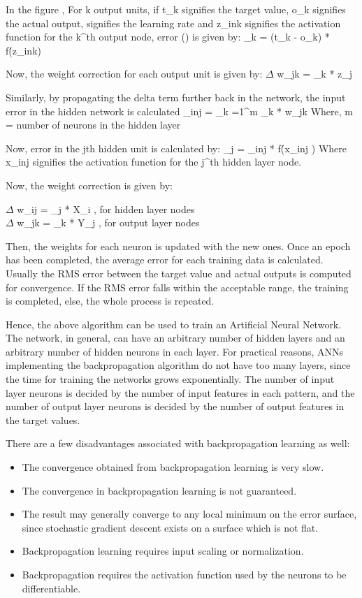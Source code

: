 In the figure \label{fig:back}, For k output units, if t_{k} \]  signifies the target value, o_{k} \] signifies the actual output, \alpha \] signifies the learning rate and z_{ink} \] signifies the activation function for the k^{th} \] output node, error (\delta \]) is given by:
\delta_k = (t_k - o_k) * f\'(z_{ink}) 

Now, the weight correction for each output unit is given by:
${\Delta}$ w_{jk} = \alpha * \delta_{k} * z_{j} \]

Similarly, by propagating the delta term further back in the network, the input error in the hidden network is calculated
	\delta_{inj} = \sum_{k =1}^{m}  \delta_k * w_{jk} \]
Where, m = number of neurons in the hidden layer

Now, error in the jth hidden unit is calculated by:
	\delta_j = \delta_{inj} * f\'(x_{inj} \])
Where x_{inj} \] signifies the activation function for the j^{th} \] hidden layer node.

Now, the weight correction is given by:

${\Delta}$ w_{ij} = \alpha * \delta_j * X_i \] 	, for hidden layer nodes\\
${\Delta}$ w_{jk} = \alpha * \delta_k * Y_j \]	, for output layer nodes

Then, the weights for each neuron is updated with the new ones. Once an epoch has been completed, the average error for each training data is calculated. Usually the RMS error between the target value and actual outputs is computed for convergence. If the RMS error falls within the acceptable range, the training is completed, else, the whole process is repeated.

Hence, the above algorithm can be used to train an Artificial Neural Network. The network, in general, can have an arbitrary number of hidden layers and an arbitrary number of hidden neurons in each layer. For practical reasons, ANNs implementing the backpropagation algorithm do not have too many layers, since the time for training the networks grows exponentially. The number of input layer neurons is decided by the number of input features in each pattern, and the number of output layer neurons is decided by the number of output features in the target values.  

There are a few disadvantages associated with backpropagation learning as well: 
\begin{itemize}
 \item The convergence obtained from backpropagation learning is very slow. 
\item The convergence in backpropagation learning is not guaranteed. 
\item The result may generally converge to any local minimum on the error surface, since stochastic gradient descent exists on a surface which is not flat. 
\item Backpropagation learning requires input scaling or normalization. 
\item Backpropagation requires the activation function used by the neurons to be differentiable.
\end{itemize}

